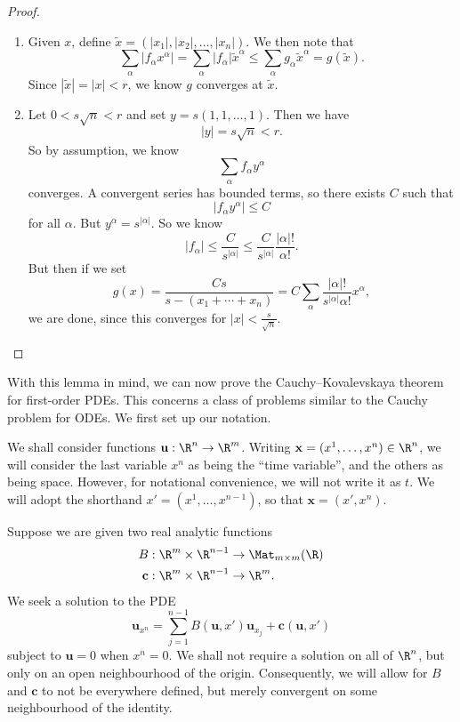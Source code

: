 \documentclass[a4paper]{article}
\begin{document}
\begin{proof}\leavevmode
  \begin{enumerate}
    \item Given $x$, define $\tilde{x} = (|x_1|, |x_2|, \ldots, |x_n|)$. We then note that
      \[
        \sum_\alpha |f_\alpha x^\alpha| = \sum_\alpha |f_\alpha| \tilde{x}^\alpha \leq \sum_\alpha g_\alpha \tilde{x}^\alpha = g(\tilde{x}).
      \]
      Since $|\tilde{x}| = |x| < r$, we know $g$ converges at $\tilde{x}$.
    \item Let $0 < s\sqrt{n} < r$ and set $y = s(1, 1, \ldots, 1)$. Then we have
      \[
        |y| = s \sqrt{n} < r.
      \]
      So by assumption, we know
      \[
        \sum_\alpha f_\alpha y^\alpha
      \]
      converges. A convergent series has bounded terms, so there exists $C$ such that
      \[
        |f_\alpha y^\alpha| \leq C
      \]
      for all $\alpha$. But $y^\alpha = s^{|\alpha|}$. So we know
      \[
        |f_\alpha| \leq \frac{C}{s^{|\alpha|}} \leq \frac{C}{s^{|\alpha|}} \frac{|\alpha|!}{\alpha!}.
      \]
      But then if we set
      \[
        g(x) = \frac{Cs}{s - (x_1 + \cdots + x_n)} = C \sum_\alpha \frac{|\alpha|!}{s^{|\alpha|}\alpha!} x^\alpha,
      \]
      we are done, since this converges for $|x| < \frac{s}{\sqrt{n}}$.
  \end{enumerate}
\end{proof}

With this lemma in mind, we can now prove the Cauchy--Kovalevskaya theorem for first-order PDEs. This concerns a class of problems similar to the Cauchy problem for ODEs. We first set up our notation.

We shall consider functions $\mathbf{u}: \R^n \to \R^m$. Writing $\mathbf{x} = (x^1, \ldots, x^n) \in \R^n$, we will consider the last variable $x^n$ as being the ``time variable'', and the others as being space. However, for notational convenience, we will not write it as $t$. We will adopt the shorthand $x' = (x^1, \ldots, x^{n - 1})$, so that $\mathbf{x} = (x', x^n)$.

Suppose we are given two real analytic functions
\begin{align*}
  B: \R^m \times \R^{n - 1} &\to \Mat_{m \times m}(\R)\\
  \mathbf{c}: \R^m \times \R^{n - 1} &\to \R^m.
\end{align*}
We seek a solution to the PDE
\[
  \mathbf{u}_{x^n} = \sum_{j = 1}^{n - 1}B(\mathbf{u}, x') \mathbf{u}_{x_j} + \mathbf{c}(\mathbf{u}, x')
\]
subject to $\mathbf{u} = 0$ when $x^n = 0$. We shall not require a solution on all of $\R^n$, but only on an open neighbourhood of the origin. Consequently, we will allow for $B$ and $\mathbf{c}$ to not be everywhere defined, but merely convergent on some neighbourhood of the identity.
\end{document}
